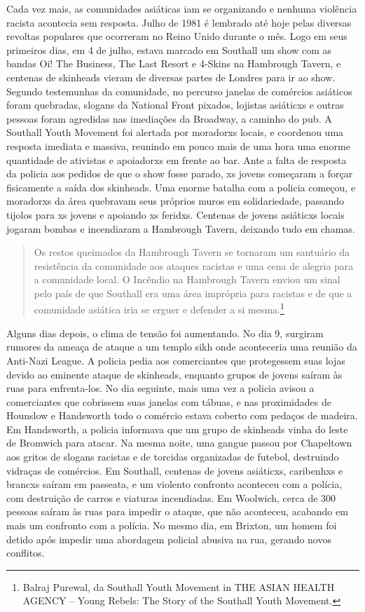 Cada vez mais, as comunidades asiáticas iam se organizando e nenhuma violência racista acontecia sem resposta. Julho de 1981 é lembrado até hoje pelas diversas revoltas populares que ocorreram no Reino Unido durante o mês. Logo em seus primeiros dias, em 4 de julho, estava marcado em Southall um show com as bandas Oi! The Business, The Last Resort e 4-Skins na Hambrough Tavern, e centenas de skinheads vieram de diversas partes de Londres para ir ao show. Segundo testemunhas da comunidade, no percurso janelas de comércios asiáticos foram quebradas, slogans da National Front pixados, lojistas asiáticxs e outras pessoas foram agredidas nas imediações da Broadway, a caminho do pub. A Southall Youth Movement foi alertada por moradorxs locais, e coordenou uma resposta imediata e massiva, reunindo em pouco mais de uma hora uma enorme quantidade de ativistas e apoiadorxs em frente ao bar. Ante a falta de resposta da policia aos pedidos de que o show fosse parado, xs jovens começaram a forçar fisicamente a saída dos skinheads. Uma enorme batalha com a policia começou, e moradorxs da área quebravam seus próprios muros em solidariedade, passando tijolos para xs jovens e apoiando xs feridxs. Centenas de jovens asiáticxs locais jogaram bombas e incendiaram a Hambrough Tavern, deixando tudo em chamas.

\begin{quote}
Os restos queimados da Hambrough Tavern se tornaram um santuário da resistência da comunidade aos ataques racistas e uma cena de alegria para a comunidade local. O Incêndio na Hambrough Tavern enviou um sinal pelo país de que Southall era uma área imprópria para racistas e de que a comunidade asiática iria se erguer e defender a si mesma.\footnote{Balraj Purewal, da Southall Youth Movement in THE ASIAN HEALTH AGENCY – Young Rebels: The Story of the Southall Youth Movement.}
\end{quote}

Alguns dias depois, o clima de tensão foi aumentando. No dia 9, surgiram rumores da ameaça de ataque a um templo sikh onde aconteceria uma reunião da Anti-Nazi League. A policia pedia aos comerciantes que protegessem suas lojas devido ao eminente ataque de skinheads, enquanto grupos de jovens saíram às ruas para enfrenta-los. No dia seguinte, mais uma vez a policia avisou a comerciantes que cobrissem suas janelas com tábuas, e nas proximidades de Hounslow e Handsworth todo o comércio estava coberto com pedaços de madeira. Em Handsworth, a policia informava que um grupo de skinheads vinha do leste de Bromwich para atacar. Na mesma noite, uma gangue passou por Chapeltown aos gritos de slogans racistas e de torcidas organizadas de futebol, destruindo vidraças de comércios. Em Southall, centenas de jovens asiáticxs, caribenhxs e brancxs saíram em passeata, e um violento confronto aconteceu com a polícia, com destruição de carros e viaturas incendiadas. Em Woolwich, cerca de 300 pessoas saíram às ruas para impedir o ataque, que não aconteceu, acabando em mais um confronto com a polícia. No mesmo dia, em Brixton, um homem foi detido após impedir uma abordagem policial abusiva na rua, gerando novos conflitos.

